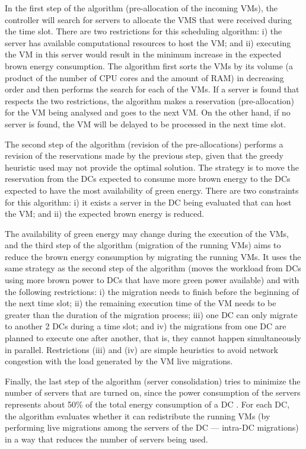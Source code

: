 In the first step of the algorithm (pre-allocation of the incoming
VMs), the controller will search for servers to allocate the VMS that were received during the time slot. There are two restrictions
for this scheduling algorithm: i) the server has available
computational resources to host the VM;  and ii) executing the VM in
this server would result in the minimum increase in the expected brown
energy consumption. The algorithm first sorts the VMs by its volume (a product of the number of CPU cores and the amount of RAM) in decreasing order and then performs the search for each of the VMs. If a server is found that respects the two restrictions, the algorithm makes a reservation (pre-allocation) for the VM being analysed and goes to the next VM. On the other hand, if no server is found, the VM will be delayed to be processed in the next time slot.

The second step of the algorithm (revision of the pre-allocations) performs a revision of the
reservations made by the previous step, given that the greedy heuristic used may not
provide the optimal solution.  The strategy is to move the reservation from the DCs
expected to consume more brown energy to the DCs expected to have the
most availability of green energy.  There are two constraints for this
algorithm: i) it exists a server in the DC being evaluated that can host
the VM; and ii) the expected brown energy is reduced.

The availability of green energy may change during the execution of
the VMs, and the third step of the algorithm (migration of the running
VMs) aims to reduce the brown energy consumption by migrating the running VMs. It uses the same strategy as the second step of the algorithm (moves the workload
from DCs using more brown power to DCs that have more green power
available) and with the following restrictions: i) the migration needs
to finish before the beginning of the next time slot; ii) the remaining execution time of the VM needs to be greater than the duration of the migration process; iii) one DC can only
migrate to another 2 DCs during a time slot; and iv) the migrations
from one DC are planned to execute one after another, that is, they
cannot happen simultaneously in parallel. Restrictions (iii) and (iv)
are simple heuristics to avoid network congestion with the load
generated by the VM live migrations.

Finally, the last step of the algorithm (server consolidation) tries to minimize the
number of servers that are turned on, since the power consumption of the servers represents about 50\% of the total
energy consumption of a DC \cite{power_to_the_people}. For each DC, the algorithm evaluates whether it can redistribute the running VMs (by performing live migrations among the servers of the DC --- intra-DC migrations)
in a way that reduces the number of servers being used.


